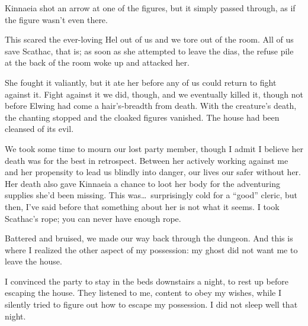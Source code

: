 Kinnaeia shot an arrow at one of the figures, but it simply passed through, as if the figure wasn't even there.

This scared the ever-loving Hel out of us and we tore out of the room. All of us save Scathac, that is; as soon as she attempted to leave the dias, the refuse pile at the back of the room woke up and attacked her.

She fought it valiantly, but it ate her before any of us could return to fight against it. Fight against it we did, though, and we eventually killed it, though not before Elwing had come a hair's-breadth from death. With the creature's death, the chanting stopped and the cloaked figures vanished. The house had been cleansed of its evil.

We took some time to mourn our lost party member, though I admit I believe her death was for the best in retrospect. Between her actively working against me and her propensity to lead us blindly into danger, our lives our safer without her. Her death also gave Kinnaeia a chance to loot her body for the adventuring supplies she'd been missing. This was\dots\ surprisingly cold for a ``good'' cleric, but then, I've said before that something about her is not what it seems. I took Scathac's rope; you can never have enough rope.

Battered and bruised, we made our way back through the dungeon. And this is where I realized the other aspect of my possession: my ghost did not want me to leave the house.

I convinced the party to stay in the beds downstairs a night, to rest up before escaping the house. They listened to me, content to obey my wishes, while I silently tried to figure out how to escape my possession. I did not sleep well that night.

\sleep
